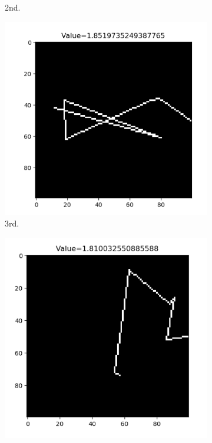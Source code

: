 \documentclass{mcmthesis}
\begin{document}
\begin{figure}[h]
\begin{subfigure}[b]{0.16\textwidth}
		\caption{2nd.}
	\end{subfigure}
	\begin{subfigure}[b]{0.16\textwidth}
		\includegraphics[width=\textwidth]{figures/shot3.png}
		\caption{3rd.}
	\end{subfigure}
	\begin{subfigure}[b]{0.16\textwidth}
		\includegraphics[width=\textwidth]{figures/shot4.png}

\end{subfigure}
\end{figure}
\end{document}
